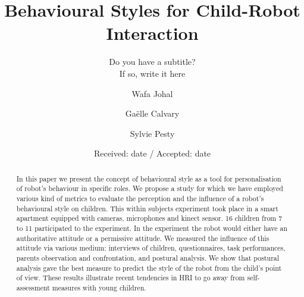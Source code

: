 \documentclass[smallextended]{svjour3}
\begin{document}
\title{Behavioural Styles for Child-Robot Interaction%
}
\subtitle{Do you have a subtitle?\\ If so, write it here}


\author{Wafa Johal         \and
        Gaëlle Calvary \and %
        Sylvie Pesty
}



\date{Received: date / Accepted: date}
\maketitle
\begin{abstract}
	In this paper we present the concept of behavioural style as a tool for personalisation of robot's behaviour in specific roles. 
	We propose a study for which we have employed various kind of metrics to evaluate the perception and the influence of a robot's behavioural style on children. 
	This within subjects experiment took place in a smart apartment equipped with cameras, microphones and kinect sensor. 16 children from 7 to 11 participated to the experiment.
	In the experiment the robot would either have an authoritative attitude or a permissive attitude. 
	We measured the influence of this attitude via various medium:
	interviews of children, questionnaires, task performances, parents observation and confrontation, and postural analysis. 
	We show that postural analysis gave the best measure to predict the style of the robot from the child's point of view.
	These results illustrate recent tendencies in HRI to go away from self-assessment measures with young children.
\end{abstract}
\end{document}
